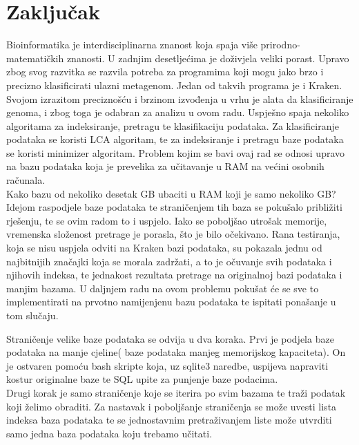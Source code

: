 \documentclass[times, utf8, zavrsni]{fer}
\begin{document}
\chapter{Zaključak}
Bioinformatika je interdisciplinarna znanost koja spaja više prirodno-matematičkih znanosti. U zadnjim desetljećima je doživjela veliki porast. Upravo zbog svog razvitka se razvila potreba za programima koji mogu jako brzo i precizno klasificirati ulazni metagenom. Jedan od takvih programa je i Kraken. Svojom izrazitom preciznošću i brzinom izvođenja u vrhu je alata da  klasificiranje genoma, i zbog toga je odabran za analizu u ovom radu. Uspješno spaja nekoliko algoritama za indeksiranje, pretragu te klasifikaciju podataka. Za klasificiranje podataka se koristi LCA algoritam, te za indeksiranje i pretragu baze podataka se koristi minimizer algoritam. Problem kojim se bavi ovaj rad se odnosi upravo na bazu podataka koja je prevelika za učitavanje u RAM na većini osobnih računala. \\Kako bazu od nekoliko desetak GB ubaciti u RAM koji je samo nekoliko GB? \\Idejom raspodjele baze podataka te straničenjem tih baza se pokušalo približiti rješenju, te se ovim radom to i uspjelo. Iako se poboljšao utrošak memorije, vremenska složenost pretrage je porasla, što je bilo očekivano. Rana testiranja, koja se nisu uspjela odviti na Kraken bazi podataka, su pokazala jednu od najbitnijih značajki koja se morala zadržati, a to je očuvanje svih podataka i njihovih indeksa, te jednakost rezultata pretrage na originalnoj bazi podataka i manjim bazama. U daljnjem radu na ovom problemu pokušat će se sve to implementirati na prvotno namijenjenu bazu podataka te ispitati ponašanje u tom slučaju.





\begin{sazetak}
Straničenje velike baze podataka se odvija u dva koraka. Prvi je podjela baze podataka na manje cjeline( baze podataka manjeg memorijskog kapaciteta). On je ostvaren pomoću bash skripte koja, uz sqlite3 naredbe, uspijeva napraviti kostur originalne baze te SQL upite za punjenje baze podacima.\\
Drugi  korak je samo straničenje koje se iterira po svim bazama te traži podatak koji želimo obraditi. Za nastavak i poboljšanje straničenja se može uvesti lista indeksa baza podataka te se jednostavnim pretraživanjem liste može utvrditi samo jedna baza podataka koju trebamo učitati.

\end{sazetak}
\end{document}
